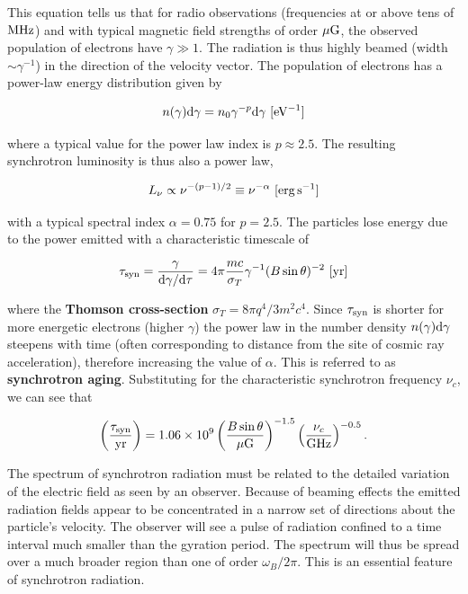 \documentclass[a4paper,10pt]{article}
\begin{document}
{\noindent}This equation tells us that for radio observations (frequencies at or above tens of ${\rm MHz}$) and with typical magnetic field strengths of order $\mu{\rm G}$, the observed population of electrons have $\gamma\gg1$. The radiation is thus highly beamed (width $\sim\gamma^{-1}$) in the direction of the velocity vector. The population of electrons has a power-law energy distribution given by

\begin{align*}
    n(\gamma){\rm d}\gamma = n_0\gamma^{-p}{\rm d}\gamma ~ [{\rm eV^{-1}}]
\end{align*}

{\noindent}where a typical value for the power law index is $p\approx2.5$. The resulting synchrotron luminosity is thus also a power law,

\begin{align*}
    L_\nu \propto \nu^{-(p-1)/2}\equiv \nu^{-\alpha} ~ [{\rm erg\,s^{-1}}]
\end{align*}

{\noindent}with a typical spectral index $\alpha=0.75$ for $p=2.5$. The particles lose energy due to the power emitted with a characteristic timescale of

\begin{align*}
    \tau_{\rm syn} = \frac{\gamma}{{\rm d}\gamma/{\rm d}\tau} = 4\pi\frac{mc}{\sigma_T}\gamma^{-1}(B\sin\theta)^{-2} ~ [{\rm yr}]
\end{align*}

{\noindent}where the \textbf{Thomson cross-section} $\sigma_T=8\pi q^4/3m^2c^4$. Since $\tau_{\rm syn}$ is shorter for more energetic electrons (higher $\gamma$) the power law in the number density $n(\gamma){\rm d}\gamma$ steepens with time (often corresponding to distance from the site of cosmic ray acceleration), therefore increasing the value of $\alpha$. This is referred to as \textbf{synchrotron aging}. Substituting for the characteristic synchrotron frequency $\nu_c$, we can see that

\begin{align*}
    \left(\frac{\tau_{\rm syn}}{{\rm yr}}\right) = 1.06\times10^9 \left(\frac{B\sin\theta}{\mu{\rm G}}\right)^{-1.5} \left(\frac{\nu_c}{{\rm GHz}}\right)^{-0.5}.
\end{align*}

{\noindent}The spectrum of synchrotron radiation must be related to the detailed variation of the electric field as seen by an observer. Because of beaming effects the emitted radiation fields appear to be concentrated in a narrow set of directions about the particle's velocity. The observer will see a pulse of radiation confined to a time interval much smaller than the gyration period. The spectrum will thus be spread over a much broader region than one of order $\omega_B/2\pi$. This is an essential feature of synchrotron radiation.
\end{document}
